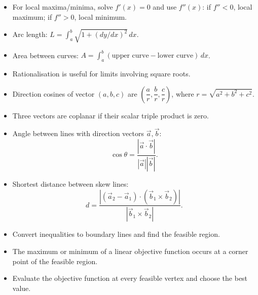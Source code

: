\documentclass[11pt,a4paper]{article}
\begin{document}
\begin{tcolorbox}[colback=softgreen,colframe=green!45!black,title={4. Calculus}]
\begin{itemize}[leftmargin=*]
\item For local maxima/minima, solve $f'(x)=0$ and use $f''(x)$: if $f''<0$, local maximum; if $f''>0$, local minimum.
\item Arc length: $L=\int_a^b\sqrt{1+(dy/dx)^2}\,dx$.
\item Area between curves: $A=\int_a^b(\text{upper curve}-\text{lower curve})\,dx$.
\item Rationalisation is useful for limits involving square roots.
\end{itemize}
\end{tcolorbox}

\begin{tcolorbox}[colback=softgreen,colframe=green!45!black,title={5. Three-dimensional geometry and vectors}]
\begin{itemize}[leftmargin=*]
\item Direction cosines of vector $(a,b,c)$ are $\left(\dfrac{a}{r},\dfrac{b}{r},\dfrac{c}{r}\right)$, where $r=\sqrt{a^2+b^2+c^2}$.
\item Three vectors are coplanar if their scalar triple product is zero.
\item Angle between lines with direction vectors $\vec a,\vec b$:
\[
\cos\theta=\frac{|\vec a\cdot\vec b|}{|\vec a||\vec b|}.
\]
\item Shortest distance between skew lines:
\[
d=\frac{|(\vec a_2-\vec a_1)\cdot(\vec b_1\times\vec b_2)|}{|\vec b_1\times\vec b_2|}.
\]
\end{itemize}
\end{tcolorbox}

\begin{tcolorbox}[colback=softgreen,colframe=green!45!black,title={6. Linear programming}]
\begin{itemize}[leftmargin=*]
\item Convert inequalities to boundary lines and find the feasible region.
\item The maximum or minimum of a linear objective function occurs at a corner point of the feasible region.
\item Evaluate the objective function at every feasible vertex and choose the best value.
\end{itemize}
\end{tcolorbox}
\end{document}
